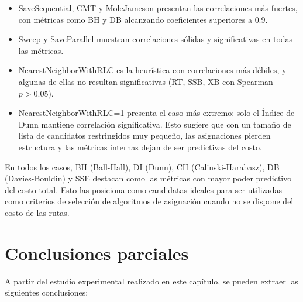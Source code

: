 \begin{itemize}
  \item {SaveSequential, CMT y MoleJameson} presentan las correlaciones m\'as fuertes, con m\'etricas como BH y DB alcanzando coeficientes superiores a $0.9$.
  \item {Sweep y SaveParallel} muestran correlaciones s\'olidas y significativas en todas las m\'etricas.
  \item {NearestNeighborWithRLC} es la heur\'istica con correlaciones m\'as d\'ebiles, y algunas de ellas no resultan significativas (RT, SSB, XB con Spearman $p > 0.05$).
  \item {NearestNeighborWithRLC=1} presenta el caso m\'as extremo: solo el \'Indice de Dunn mantiene correlaci\'on significativa. Esto sugiere que con un tama\~no de lista de candidatos restringidos muy peque\~no, las asignaciones pierden estructura y las m\'etricas internas dejan de ser predictivas del costo.
\end{itemize}

En todos los casos, {BH (Ball-Hall), DI (Dunn), CH (Calinski-Harabasz), DB (Davies-Bouldin) y SSE} destacan como las m\'etricas con mayor poder predictivo del costo total. Esto las posiciona como candidatas ideales para ser utilizadas como criterios de selecci\'on de algoritmos de asignaci\'on cuando no se dispone del costo de las rutas.

\section{Conclusiones parciales}

A partir del estudio experimental realizado en este cap\'itulo, se pueden extraer las siguientes conclusiones:

